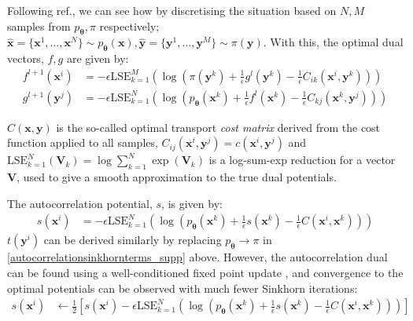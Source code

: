 Following ref., we can see how by discretising the situation based on $N, M$ samples from $p_{\boldsymbol\theta}, \pi$ respectively; $ \hat{\mathbf{x}} = \{\mathbf{x}^1, \dots, \mathbf{x}^N\}\sim p_{\boldsymbol\theta}(\mathbf{x}),  \hat{\mathbf{y}} =\{\mathbf{y}^1, \dots, \mathbf{y}^M\} \sim \pi(\mathbf{y})$. With this, the optimal dual vectors, $f, g$ are given by:
\begin{align}
    f^{l+1}(\mathbf{x}^i) &= -\epsilon \text{LSE}_{k=1}^M\left(\log\left(\pi(\mathbf{\mathbf{y}}^k) + \frac{1}{\epsilon}g^{l}(\mathbf{y}^k) - \frac{1}{\epsilon} C_{ik}(\mathbf{x}^i, \mathbf{y}^k)\right)\right)\label{sinkhorndualvectors_1_supp}\\
    g^{l+1}(\mathbf{y}^j) &= -\epsilon \text{LSE}_{k=1}^N\left(\log\left(p_{\boldsymbol\theta}(\mathbf{x}^k) + \frac{1}{\epsilon}f^{l}(\mathbf{x}^k) - \frac{1}{\epsilon} C_{kj}(\mathbf{x}^k, \mathbf{y}^j)\right)\right) \label{sinkhorndualvectors_2_supp}
\end{align}



$C(\mathbf{x}, \mathbf{y})$ is the so-called optimal transport \textit{cost matrix} derived from the cost function applied to all samples, $C_{ij}(\mathbf{x}^i, \mathbf{y}^j) = c(\mathbf{x}^i, \mathbf{y}^j)$ and $\text{LSE}_{k=1}^N(\mathbf{V}_k) = \log\sum\limits_{k=1}^N\exp(\mathbf{V}_k)$ is a log-sum-exp reduction for a vector $\mathbf{V}$, used to give a smooth approximation to the true dual potentials.

The autocorrelation potential, $s$, is given by:
\begin{align}
    s(\mathbf{x}^i) &= -\epsilon \text{LSE}_{k=1}^N\left(\log\left(p_{\boldsymbol\theta}(\mathbf{\mathbf{x}}^k) + \frac{1}{\epsilon}s(\mathbf{x}^k) - \frac{1}{\epsilon} C(\mathbf{x}^i, \mathbf{x}^k)\right)\right) \label{autocorrelationsinkhornterms_supp}
\end{align}
$t(\mathbf{y}^i)$ can be derived similarly by replacing $p_{\boldsymbol\theta} \rightarrow \pi$ in \eqref{autocorrelationsinkhornterms_supp} above. However, the autocorrelation dual can be found using a well-conditioned fixed point update , and convergence to the optimal potentials can be observed with much fewer Sinkhorn iterations:
\begin{align}
    s(\mathbf{x}^i) &\leftarrow \frac{1}{2}\left[s(\mathbf{x}^i)-\epsilon \text{LSE}_{k=1}^N\left(\log\left(p_{\boldsymbol\theta}(\mathbf{x}^k) + \frac{1}{\epsilon}s(\mathbf{x}^k) - \frac{1}{\epsilon} C(\mathbf{x}^i, \mathbf{x}^k)\right)\right)\right] \label{autocorrelationsinkhorntermsupdate_supp}
\end{align}

